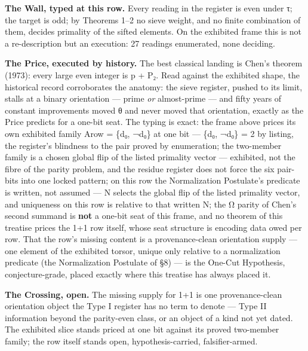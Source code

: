 \documentclass[10pt]{article}
\renewcommand{\_}{\origunderscore\allowbreak}
\begin{document}
\textbf{The Wall, typed at this row.} Every reading in the register is
even under τ; the target is odd; by Theorems 1--2 no sieve weight, and
no finite combination of them, decides primality of the sifted elements.
On the exhibited frame this is not a re-description but an execution: 27
readings enumerated, none deciding.

\textbf{The Price, executed by history.} The best classical landing is
Chen's theorem (1973): every large even integer is p + P₂. Read against
the exhibited shape, the historical record corroborates the anatomy: the
sieve register, pushed to its limit, stalls at a binary orientation ---
prime \emph{or} almost-prime --- and fifty years of constant
improvements moved θ and never moved that orientation, exactly as the
Price predicts for a one-bit seat. The typing is exact: the frame above
prices its own exhibited family A\_row = \{d₀, ¬d₀\} at one bit ---
\textbar\{d₀, ¬d₀\}\textbar{} = 2 by listing, the register's blindness
to the pair proved by enumeration; the two-member family is a chosen
global flip of the listed primality vector --- exhibited, not the fibre
of the parity problem, and the residue register does not force the six
pair-bits into one locked pattern; on this row the Normalization
Postulate's predicate is written, not assumed --- N selects the global
flip of the listed primality vector, and uniqueness on this row is
relative to that written N; the Ω parity of Chen's second summand is
\textbf{not} a one-bit seat of this frame, and no theorem of this
treatise prices the 1+1 row itself, whose seat structure is encoding
data owed per row. That the row's missing content is a provenance-clean
orientation supply --- one element of the exhibited torsor, unique only
relative to a normalization predicate (the Normalization Postulate of
§8) --- is the One-Cut Hypothesis, conjecture-grade, placed exactly
where this treatise has always placed it.

\textbf{The Crossing, open.} The missing supply for 1+1 is one
provenance-clean orientation object the Type I register has no term to
denote --- Type II information beyond the parity-even class, or an
object of a kind not yet dated. The exhibited slice stands priced at one
bit against its proved two-member family; the row itself stands open,
hypothesis-carried, falsifier-armed.
\end{document}
